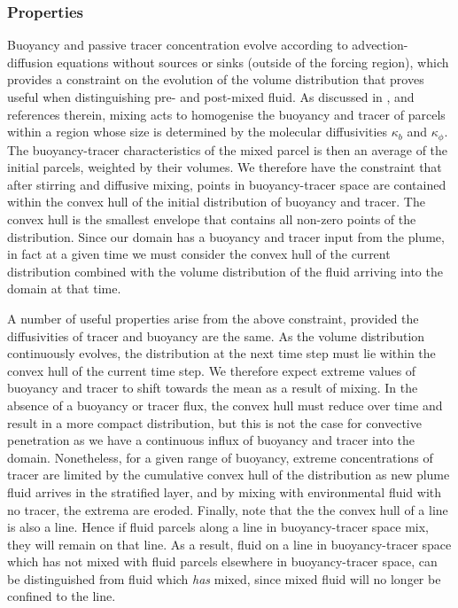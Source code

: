\documentclass[a4paper]{article}
\begin{document}
\subsubsection{Properties}
\label{sec:PDFproperties}
Buoyancy and passive tracer concentration evolve according to advection-diffusion equations without sources or
sinks (outside of the forcing region), which provides a constraint on the evolution of the volume distribution
that proves useful when distinguishing pre- and post-mixed fluid. As discussed in \citet{penney2020},
\citet{plumb2007} and references therein, mixing acts to homogenise the buoyancy and tracer of parcels within
a region whose size is determined by the molecular diffusivities $\kappa_b$ and $\kappa_{\phi}$. The
buoyancy-tracer characteristics of the mixed parcel is then an average of the initial parcels, weighted by
their volumes. We therefore have the constraint that after stirring and diffusive mixing, points in
buoyancy-tracer space are contained within the convex hull of the initial distribution of buoyancy and tracer.
The convex hull is the smallest envelope that contains all non-zero points of the distribution. Since our
domain has a buoyancy and tracer input from the plume, in fact at a given time we must consider the convex
hull of the current distribution combined with the volume distribution of the fluid arriving into the
domain at that time.

A number of useful properties arise from the above constraint, provided the diffusivities of tracer and
buoyancy are the same. As the volume distribution continuously evolves, the distribution at the next time step
must lie within the convex hull of the current time step. We therefore expect extreme values of buoyancy and
tracer to shift towards the mean as a result of mixing. In the absence of a buoyancy or tracer flux, the
convex hull must reduce over time and result in a more compact distribution, but this is not the case for
convective penetration as we have a continuous influx of buoyancy and tracer into the domain. Nonetheless, for
a given range of buoyancy, extreme concentrations of tracer are limited by the cumulative convex hull of the
distribution as new plume fluid arrives in the stratified layer, and by mixing with environmental fluid with
no tracer, the extrema are eroded. Finally, note that the the convex hull of a line is also a line.  Hence if
fluid parcels along a line in buoyancy-tracer space mix, they will remain on that line. As a result,
fluid on a line in buoyancy-tracer space which has not mixed with fluid parcels elsewhere in buoyancy-tracer
space, can be distinguished from fluid which \emph{has} mixed, since mixed fluid will no longer be confined to
the line.
\end{document}
